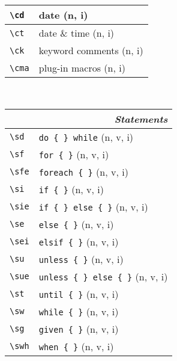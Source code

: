\documentclass[oneside,10pt,landscape,DIV17]{scrartcl}
\begin{document}
\begin{multicols}{3}
\begin{center}
\begin{tabular}[]{|p{11mm}|p{60mm}|}
\hline     \verb'\cd'   & date                              \hfill (n, i)   \\
\hline     \verb'\ct'   & date \& time                      \hfill (n, i)   \\
\hline     \verb'\ck'   & keyword comments                  \hfill (n, i)   \\
\hline     \verb'\cma'  & plug-in macros                     \hfill (n, i)   \\
\hline
\end{tabular}\\
%
%
\begin{tabular}[]{|p{11mm}|p{60mm}|}
\hline
\multicolumn{2}{|r|}{\textsl{\textbf{S}tatements}}                    \\[1.0ex]
\hline \verb'\sd'      & \verb'do { } while'          \hfill (n, v, i)\\
\hline \verb'\sf'      & \verb'for { }'               \hfill (n, v, i)\\
\hline \verb'\sfe'     & \verb'foreach { }'           \hfill (n, v, i)\\
\hline \verb'\si'      & \verb'if { }'                \hfill (n, v, i)\\
\hline \verb'\sie'     & \verb'if { } else { }'       \hfill (n, v, i)\\
\hline \verb'\se'      & \verb'else { }'              \hfill (n, v, i)\\
\hline \verb'\sei'     & \verb'elsif { }'             \hfill (n, v, i)\\
\hline \verb'\su'      & \verb'unless { }'            \hfill (n, v, i)\\
\hline \verb'\sue'     & \verb'unless { } else { }'   \hfill (n, v, i)\\
\hline \verb'\st'      & \verb'until { }'             \hfill (n, v, i)\\
\hline \verb'\sw'      & \verb'while { }'             \hfill (n, v, i)\\
\hline \verb'\sg'      & \verb'given { }'             \hfill (n, v, i)\\
\hline \verb'\swh'     & \verb'when { }'              \hfill (n, v, i)\\

\end{tabular}
\end{center}
\end{multicols}
\end{document}
